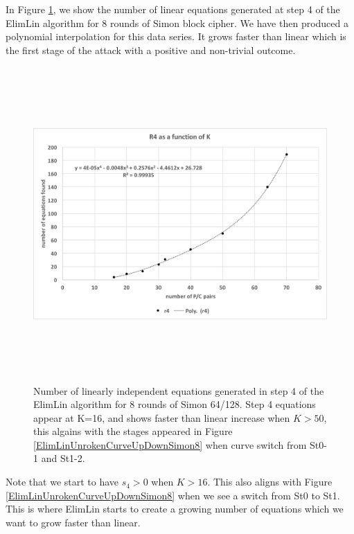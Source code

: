 In Figure \ref{fig:ElimLinQuadConjExampleSimon8r4}, we show the number of linear equations generated at step 4 of the ElimLin algorithm for 8 rounds of Simon block cipher. We have then produced a polynomial interpolation for this data series. It grows faster than linear which is the first stage of the attack with a positive and non-trivial outcome. 

\begin{figure}[!h]
	\vspace{-0.2cm}
	\centering
	\includegraphics*[width=140mm,height=12cm]{./pics/Test63.png}
		\caption[Number of linearly independent equations generated at step 4]{Number of linearly independent equations generated in step 4
			of the ElimLin algorithm
			for 8 rounds of Simon 64/128. Step 4 equations appear at K=16, and shows faster than linear increase when $K > 50$, this algains with the stages appeared in Figure  \ref{ElimLinUnrokenCurveUpDownSimon8} when curve switch from St0-1 and St1-2. }
	\label{fig:ElimLinQuadConjExampleSimon8r4}
	\vspace{-0.1cm}
\end{figure}

Note that we start to have $s_4 > 0$ when $K >16$. This also aligns with Figure \ref{ElimLinUnrokenCurveUpDownSimon8} when we see a switch from St0 to St1. 
This is where ElimLin starts to create a growing number of equations which we want to 
grow faster than linear. 

